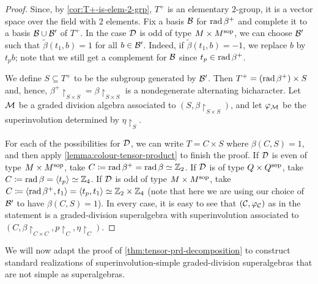 \begin{proof}
    Since, by \cref{cor:T+-is-elem-2-grp}, $T^+$ is an elementary $2$-group, it is a vector space over the field with $2$ elements. 
    Fix a basis $\mathcal B$ for $\operatorname{rad} \beta^+$ and complete it to a basis  $\mathcal B \cup \mathcal B'$ of $T^+$. 
    In the case $\mathcal{D}$ is odd of type $M\times M^{\mathrm{sop}}$, we can choose $\mathcal B'$ such that $\tilde\beta(t_1, b) = 1$ for all $b\in \mathcal B'$. 
    Indeed, if $\tilde\beta(t_1, b) = -1$, we replace $b$ by $t_p b$; note that we still get a complement for $\mathcal B$ since $t_p \in \operatorname{rad} \beta^+$. 
    
    We define $S \subseteq T^+$ to be the subgroup generated by $\mathcal B'$. 
    Then $T^+ = (\operatorname{rad} \beta^+) \times S$ and, hence, $\beta^+\restriction_{S\times S} = \beta\restriction_{S\times S}$ is a nondegenerate alternating bicharacter. 
    Let $\mathcal M$ be a graded division algebra associated to $(S, \beta\restriction_{S\times S})$, and let $\varphi_{\mathcal M}$ be the superinvolution determined by $\eta\restriction_{S}$. 
    
    For each of the possibilities for $\mathcal{D}$, we can write $T = C \times S$ where $\beta(C, S) = 1$, and then apply \cref{lemma:colour-tensor-product} to finish the proof. 
    If $\mathcal{D}$ is even of type $M\times M^{\mathrm{sop}}$, take $C \coloneqq \operatorname{rad} \beta^+ = \operatorname{rad} \beta \simeq \mathbb{Z}_2$. 
    If $\mathcal{D}$ is of type $Q\times Q^{\mathrm{sop}}$, take $C \coloneqq \operatorname{rad} \beta = \langle t_p \rangle \simeq \mathbb{Z}_4$. 
    If $\mathcal{D}$ is odd of type $M\times M^{\mathrm{sop}}$, take $C \coloneqq \langle \operatorname{rad} \beta^+, t_1 \rangle = \langle t_p, t_1 \rangle \simeq \mathbb{Z}_2 \times \mathbb{Z}_4$ (note that here we are using our choice of $\mathcal B'$ to have $\beta(C, S) = 1$). 
    In every case, it is easy to see that $(\mathcal C, \varphi_{\mathcal C})$ as in the statement is a graded-division superalgebra with superinvolution associated to $(C, \beta\restriction_{C \times C}, p\restriction_{C}, \eta\restriction_{C})$. 
\end{proof}

We will now adapt the proof of \cref{thm:tensor-prd-decomposition} to construct standard realizations of superinvolution-simple graded-division superalgebras that are not simple as superalgebras. 

